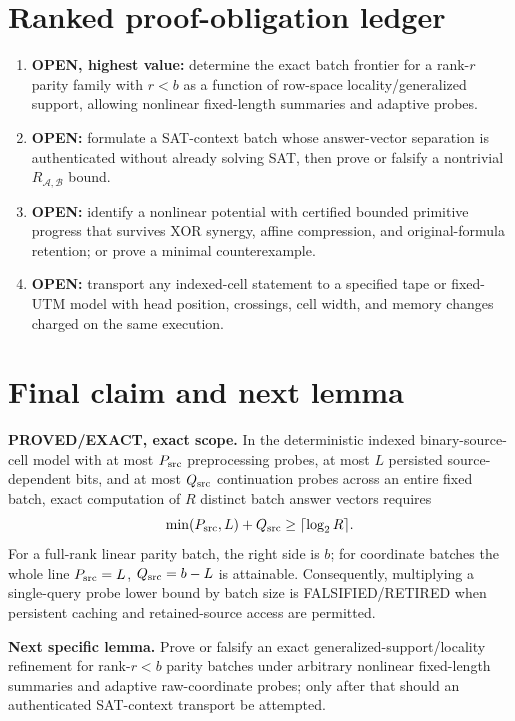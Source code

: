 \documentclass[11pt]{article}
\newcommand{\status}[1]{\textsc{#1}}
\begin{document}
\section{Ranked proof-obligation ledger}

\begin{enumerate}[leftmargin=*]
\item \textbf{OPEN, highest value:} determine the exact batch frontier for a rank-$r$ parity family with $r<b$ as a function of row-space locality/generalized support, allowing nonlinear fixed-length summaries and adaptive probes.
\item \textbf{OPEN:} formulate a SAT-context batch whose answer-vector separation is authenticated without already solving SAT, then prove or falsify a nontrivial $R_{\mathcal A,\mathcal B}$ bound.
\item \textbf{OPEN:} identify a nonlinear potential with certified bounded primitive progress that survives XOR synergy, affine compression, and original-formula retention; or prove a minimal counterexample.
\item \textbf{OPEN:} transport any indexed-cell statement to a specified tape or fixed-UTM model with head position, crossings, cell width, and memory changes charged on the same execution.
\end{enumerate}

\section{Final claim and next lemma}

\textbf{PROVED/EXACT, exact scope.}  In the deterministic indexed binary-source-cell model with at most $P_{\rm src}$ preprocessing probes, at most $L$ persisted source-dependent bits, and at most $Q_{\rm src}$ continuation probes across an entire fixed batch, exact computation of $R$ distinct batch answer vectors requires
\[
\min(P_{\rm src},L)+Q_{\rm src}\ge\lceil\log_2R\rceil.
\]
For a full-rank linear parity batch, the right side is $b$; for coordinate batches the whole line $P_{\rm src}=L$, $Q_{\rm src}=b-L$ is attainable.  Consequently, multiplying a single-query probe lower bound by batch size is \status{FALSIFIED/RETIRED} when persistent caching and retained-source access are permitted.

\textbf{Next specific lemma.}  Prove or falsify an exact generalized-support/locality refinement for rank-$r<b$ parity batches under arbitrary nonlinear fixed-length summaries and adaptive raw-coordinate probes; only after that should an authenticated SAT-context transport be attempted.

\end{document}
